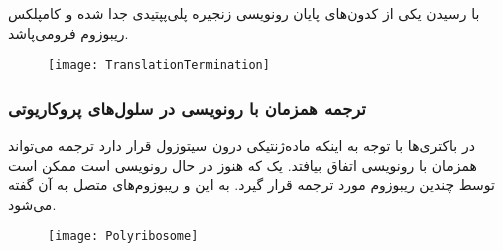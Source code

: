 با رسیدن یکی از کدون‌های پایان رونویسی زنجیره پلی‌پپتیدی جدا شده و کامپلکس ریبوزوم فرومی‌پاشد.

\begin{figure}[htbp]
\centering
\texttt{[image: TranslationTermination]}
\end{figure}

\pagebreak
\subsubsection{ترجمه همزمان با رونویسی در سلول‌های پروکاریوتی}
در باکتری‌ها با توجه به اینکه ماده‌ژنتیکی درون سیتوزول قرار دارد ترجمه می‌تواند همزمان با رونویسی اتفاق بیافتد.
یک
که هنوز در حال رونویسی است ممکن است توسط چندین ریبوزوم مورد ترجمه قرار گیرد. به این
و ریبوزوم‌های متصل به آن
گفته می‌شود.

\begin{figure}[htbp]
\centering
\texttt{[image: Polyribosome]}
\end{figure}